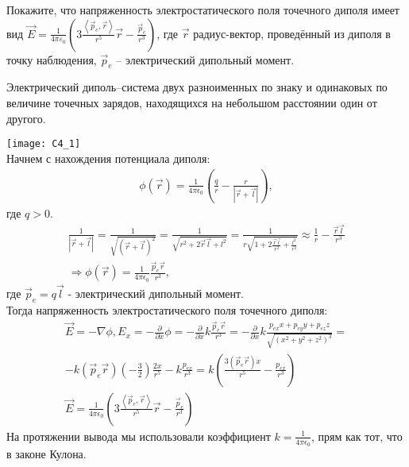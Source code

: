 \documentclass[__main__.tex]{subfiles}
\begin{document}
Покажите, что напряженность электростатического поля точечного диполя имеет вид $\vec{E} = \frac{1}{4\pi\varepsilon_0}\left( 3\frac{\left<\vec{p}_e, \vec{r}\right>}{r^5}\vec{r} - \frac{\vec{p}_e}{r^3}\right)$, где $\vec{r}$ радиус-вектор, проведённый из диполя в точку наблюдения, $\vec{p}_{e}$ -- электрический дипольный момент.\\ 
\begin{definition}
Электрический диполь–система двух разноименных по знаку и одинаковых  по  величине  точечных  зарядов,  находящихся  на небольшом расстоянии один от другого.\\
\end{definition}
\texttt{[image: C4\_1]}\\
Начнем с нахождения потенциала диполя:\\
\begin{gather}
\phi(\vec{r}) = \frac{1}{4\pi \epsilon_0}\left(\frac{q}{r}-\frac{r}{|\vec{r}+\vec{l}|}\right),
\end{gather}
где $q>0$.
\begin{gather}
\frac{1}{|\vec{r}+\vec{l}|} = \frac{1}{\sqrt{(\vec{r}+\vec{l})^2}} = \frac{1}{\sqrt{r^2+2\vec{r}\vec{l}+l^2}} = \frac{1}{r\sqrt{1+2\frac{\vec{r}\vec{l}}{r^2}+\frac{l^2}{r^2}}}\approx \frac{1}{r}-\frac{\vec{r}\vec{l}}{r^3} \\ \Longrightarrow \phi(\vec{r}) = \frac{1}{4 \pi \epsilon_0}\frac{\vec{p}_{e}\vec{r}}{r^3},
\end{gather}
где $\vec{p}_{e} = q\vec{l}$ - электрический дипольный момент.\\
Тогда напряженность электростатического поля точечного диполя:\\
\begin{gather}
\vec{E} = -\nabla \phi, E_x = -\frac{\partial}{\partial x}\phi = -\frac{\partial}{\partial x}k \frac{\vec{p}_{e}\vec{r}}{r^3} = -\frac{\partial}{\partial x}k\frac{p_{ex}x+p_{ey}y+p_{ez}z}{\sqrt{(x^2+y^2+z^2)^3}} =\\ -k(\vec{p}_{e}\vec{r})\left(-\frac{3}{2}\right)\frac{2x}{r^5}-k\frac{p_{ex}}{r^3} = k\left(\frac{3(\vec{p}_{e}\vec{r})x}{r^5}-\frac{p_{ex}}{r^3}\right)\\
\vec{E} = \frac{1}{4 \pi \epsilon_0}\left( 3\frac{\left<\vec{p}_e, \vec{r}\right>}{r^5}\vec{r} - \frac{\vec{p}_e}{r^3}\right)
\end{gather}
На протяжении вывода мы использовали коэффициент $k = \frac{1}{4 \pi \epsilon_0}$, прям как тот, что в законе Кулона.
\end{document}
